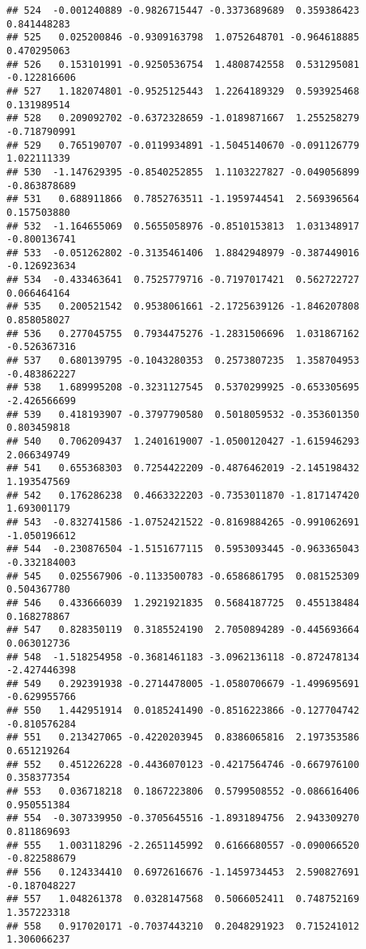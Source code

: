 \documentclass[
]{article}
\begin{document}
\begin{verbatim}
## 524  -0.001240889 -0.9826715447 -0.3373689689  0.359386423  0.841448283
## 525   0.025200846 -0.9309163798  1.0752648701 -0.964618885  0.470295063
## 526   0.153101991 -0.9250536754  1.4808742558  0.531295081 -0.122816606
## 527   1.182074801 -0.9525125443  1.2264189329  0.593925468  0.131989514
## 528   0.209092702 -0.6372328659 -1.0189871667  1.255258279 -0.718790991
## 529   0.765190707 -0.0119934891 -1.5045140670 -0.091126779  1.022111339
## 530  -1.147629395 -0.8540252855  1.1103227827 -0.049056899 -0.863878689
## 531   0.688911866  0.7852763511 -1.1959744541  2.569396564  0.157503880
## 532  -1.164655069  0.5655058976 -0.8510153813  1.031348917 -0.800136741
## 533  -0.051262802 -0.3135461406  1.8842948979 -0.387449016 -0.126923634
## 534  -0.433463641  0.7525779716 -0.7197017421  0.562722727  0.066464164
## 535   0.200521542  0.9538061661 -2.1725639126 -1.846207808  0.858058027
## 536   0.277045755  0.7934475276 -1.2831506696  1.031867162 -0.526367316
## 537   0.680139795 -0.1043280353  0.2573807235  1.358704953 -0.483862227
## 538   1.689995208 -0.3231127545  0.5370299925 -0.653305695 -2.426566699
## 539   0.418193907 -0.3797790580  0.5018059532 -0.353601350  0.803459818
## 540   0.706209437  1.2401619007 -1.0500120427 -1.615946293  2.066349749
## 541   0.655368303  0.7254422209 -0.4876462019 -2.145198432  1.193547569
## 542   0.176286238  0.4663322203 -0.7353011870 -1.817147420  1.693001179
## 543  -0.832741586 -1.0752421522 -0.8169884265 -0.991062691 -1.050196612
## 544  -0.230876504 -1.5151677115  0.5953093445 -0.963365043 -0.332184003
## 545   0.025567906 -0.1133500783 -0.6586861795  0.081525309  0.504367780
## 546   0.433666039  1.2921921835  0.5684187725  0.455138484  0.168278867
## 547   0.828350119  0.3185524190  2.7050894289 -0.445693664  0.063012736
## 548  -1.518254958 -0.3681461183 -3.0962136118 -0.872478134 -2.427446398
## 549   0.292391938 -0.2714478005 -1.0580706679 -1.499695691 -0.629955766
## 550   1.442951914  0.0185241490 -0.8516223866 -0.127704742 -0.810576284
## 551   0.213427065 -0.4220203945  0.8386065816  2.197353586  0.651219264
## 552   0.451226228 -0.4436070123 -0.4217564746 -0.667976100  0.358377354
## 553   0.036718218  0.1867223806  0.5799508552 -0.086616406  0.950551384
## 554  -0.307339950 -0.3705645516 -1.8931894756  2.943309270  0.811869693
## 555   1.003118296 -2.2651145992  0.6166680557 -0.090066520 -0.822588679
## 556   0.124334410  0.6972616676 -1.1459734453  2.590827691 -0.187048227
## 557   1.048261378  0.0328147568  0.5066052411  0.748752169  1.357223318
## 558   0.917020171 -0.7037443210  0.2048291923  0.715241012  1.306066237

\end{verbatim}
\end{document}
